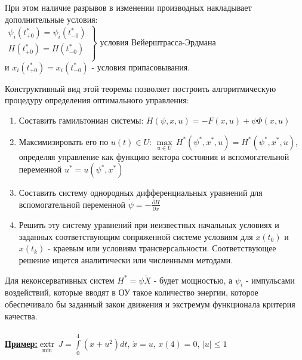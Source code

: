 \documentclass[preprint,russian,a5paper,10pt,twoside,mediummath]{ncc}
\newcommand{\ExampleMy}{\textbf{\underline{Пример:}}}
\begin{document}
При этом наличие разрывов в изменении производных накладывает дополнительные условия:
\\$\left. \begin{array}{*{35}{l}}
   {{\psi }_{i}}\left( t_{+0}^{*} \right)={{\psi }_{i}}\left( t_{-0}^{*} \right)  \\
   H\left( t_{+0}^{*} \right)=H\left( t_{-0}^{*} \right)  \\
\end{array} \right\}$ условия Вейерштрасса-Эрдмана
 \\и ${{x}_{i}}\left( t_{+0}^{*} \right)={{x}_{i}}\left( t_{-0}^{*} \right)$ - условия припасовывания.
\par Конструктивный вид этой теоремы позволяет построить алгоритмическую процедуру определения оптимального управления:
\begin{enumerate}
\item Составить гамильтониан системы: $H\left( \psi ,x,u \right)=-F\left( x,u \right)+\psi \Phi \left( x,u \right)$
\item Максимизировать его по $u\left( t \right)\in U$: $\underset{u\in U}{\mathop{\max }}\,{{H}^{*}}\left( {{\psi }^{*}},{{x}^{*}},u \right)={{H}^{*}}\left( {{\psi }^{*}},{{x}^{*}},u \right)$, определяя управление как функцию вектора состояния и вспомогательной переменной ${{u}^{*}}=u\left( {{\psi }^{*}},{{x}^{*}} \right)$
\item Составить систему однородных дифференциальных уравнений для вспомогательной переменной $\dot{\psi }=-\frac{\partial H}{\partial x}$
\item Решить эту систему уравнений при неизвестных начальных условиях и заданных соответствующим сопряженной системе условиям для $x\left( {{t}_{0}} \right)$ и $x\left( {{t}_{k}} \right)$ - краевым или условиям трансверсальности. Соответствующее решение ищется аналитически или численными методами.
\end{enumerate} 
\par Для неконсервативных систем ${{H}^{*}}=\psi \dot{X}$ - будет мощностью, а ${{\psi }_{i}}$ - импульсами воздействий, которые вводят в ОУ такое количество энергии, которое обеспечивало бы заданный закон движения и экстремум функционала критерия качества.
\\
\\
\ExampleMy   $\underset{\min }{\mathop{extr}}\,J=\int\limits_{0}^{4}{\left( x+{{u}^{2}} \right)}dt$, $\dot{x}=u$, $x\left( 4 \right)=0$, $\left| u \right|\le 1$
\end{document}
